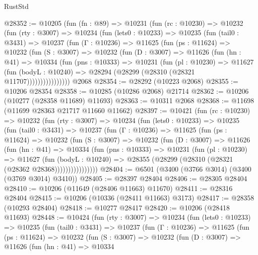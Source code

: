 \begin{lexlean}{RustStd}
\begin{coremodule}
@28352 := @10205
    (fun (fn : @89) =>
    @10231
      (fun (rc : @10230) =>
      @10232
        (fun (rty : @3007) =>
        @10234
          (fun (lets0 : @10233) =>
          @10235
            (fun (tail0 : @3431) =>
            @10237
              (fun (Γ : @10236) =>
              @11625
                (fun (ps : @11624) =>
                @10232
                  (fun (S : @3007) =>
                  @10232
                    (fun (D : @3007) =>
                    @11626
                      (fun (hn : @41) =>
                      @10334
                        (fun (pns : @10333) =>
                        @10231
                          (fun (pl : @10230) =>
                          @11627
                            (fun (bodyL : @10240) =>
                            @28294 (@28299 (@28310 (@28321 @11707))))))))))))))))
    @2068
@28354 := @28292 (@10223 @2068)
@28355 := @10206 @28354
@28358 := @10285 (@10286 @2068) @21714
@28362 := @10206 (@10277 (@28358 @11689) @11693)
@28363 := @10311 @2068
@28368 := @11698 (@11699 @28363 @21717 @11660 @11662)
@28397 := @10421
    (fun (rc : @10230) =>
    @10232
      (fun (rty : @3007) =>
      @10234
        (fun (lets0 : @10233) =>
        @10235
          (fun (tail0 : @3431) =>
          @10237
            (fun (Γ : @10236) =>
            @11625
              (fun (ps : @11624) =>
              @10232
                (fun (S : @3007) =>
                @10232
                  (fun (D : @3007) =>
                  @11626
                    (fun (hn : @41) =>
                    @10334
                      (fun (pns : @10333) =>
                      @10231
                        (fun (pl : @10230) =>
                        @11627
                          (fun (bodyL : @10240) =>
                          @28355 (@28299 (@28310 (@28321 (@28362 @28368))))))))))))))))
@28404 := @6501 (@3400 (@3766 @3014) (@3400 (@3769 @3014) @3410))
@28405 := @28397 @28404
@28406 := @28305 @28404
@28410 := @10206 (@11649 (@28406 @11663) @11670)
@28411 := @28316 @28404
@28415 := @10206 (@10336 (@28411 @11663) @3173)
@28417 := @28358 (@10293 @28404)
@28418 := @10277 @28417
@28420 := @10206 (@28418 @11693)
@28448 := @10424
    (fun (rty : @3007) =>
    @10234
      (fun (lets0 : @10233) =>
      @10235
        (fun (tail0 : @3431) =>
        @10237
          (fun (Γ : @10236) =>
          @11625
            (fun (ps : @11624) =>
            @10232
              (fun (S : @3007) =>
              @10232
                (fun (D : @3007) =>
                @11626
                  (fun (hn : @41) =>
                  @10334

\end{coremodule}
\end{lexlean}
